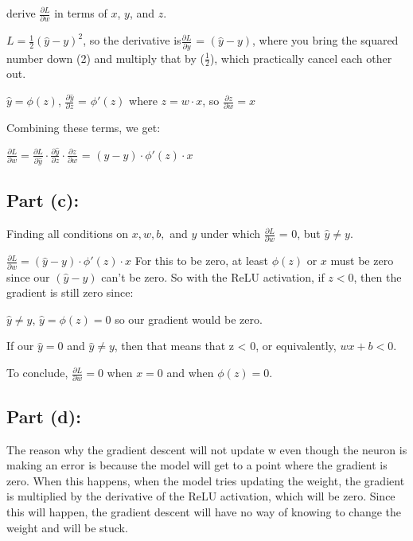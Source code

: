 \documentclass{article}
\begin{document}
\begin{center}
derive $\frac{\partial L}{\partial w}$ in terms of $x$, $y$, and $z$.
\end{center}

$L = \frac{1}{2}(\hat{y} - y)^2$, so the derivative is$\frac{\partial L}{\partial y}$ = $(\hat{y} - y)$, where you bring the squared number down (2) and multiply that by ($\frac{1}{2}$), which practically cancel each other out. 

$\hat{y} = \phi(z)$, $\frac{\partial \hat{y}}{\partial z}$ = $\phi ' (z)$ where $z = w \cdot x$, so $\frac{\partial z}{\partial w} = x$

Combining these terms, we get:

$\frac{\partial L}{\partial w} = \frac{\partial L}{\partial \hat{y}} \cdot  \frac{\partial \hat{y}}{\partial z} \cdot \frac{\partial z}{\partial w}$ = $(\hat{y} - y) \cdot \phi '(z) \cdot x$

\subsection*{Part (c):}

Finding all conditions on $x, w, b,$ and $y$ under which $\frac{\partial L}{\partial w}$ = 0, but $\hat{y} \ne y$.

$\frac{\partial L}{\partial w} = (\hat{y} - y) \cdot \phi '(z) \cdot x$
For this to be zero, at least $\phi(z)$ or $x$ must be zero since our $(\hat{y} - y)$ can't be zero. So with the ReLU activation, if $z < 0$, then the gradient is still zero since:

$\hat{y} \ne y$, $\hat{y} = \phi(z) = 0$ so our gradient would be zero.

If our $\hat{y} = 0$ and $\hat{y} \ne y$, then that means that z < 0, or equivalently, $wx + b < 0$.

To conclude, $\frac{\partial L}{\partial w} = 0$ when $x = 0$ and when $\phi(z) = 0$. 

\subsection*{Part (d):}

The reason why the gradient descent will not update w even though the neuron is making an error is because the model will get to a point where the gradient is zero. When this happens, when the model tries updating the weight, the gradient is multiplied by the derivative of the ReLU activation, which will be zero. Since this will happen, the gradient descent will have no way of knowing to change the weight and will be stuck. 
\end{document}
